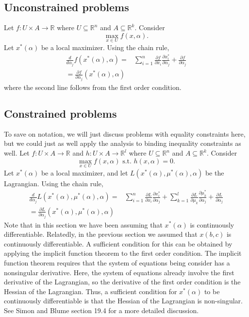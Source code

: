 \documentclass[12pt,reqno]{amsart}
\theoremstyle{definition}
\def\R{\mathbb{R}}
\renewcommand{\to}{{\rightarrow}}
\begin{document}
\subsection{Unconstrained problems}

Let $f:U \times A \to \R$ where $U \subseteq \R^n$ and $A
\subseteq \R^k$. Consider
\[ \max_{x \in U} f(x,\alpha). \]
Let $x^*(\alpha)$ be a local maximizer. Using the chain rule,
\begin{align*}
  \frac{d }{d \alpha_j} f(x^*(\alpha),\alpha) = & \sum_{i=1}^n
  \frac{\partial f}{\partial x_i} \frac{\partial x_i^*}{\partial \alpha_j}
  + \frac{\partial f}{\partial \alpha_j } \\
  = \frac{\partial f}{\partial \alpha_j }(x^*(\alpha),\alpha)
\end{align*}
where the second line follows from the first order condition.


\subsection{Constrained problems}

To save on notation, we will just discuss problems with equality
constraints here, but we could just as well apply the analysis to
binding inequality constraints as well. 
Let $f:U \times A \to \R$ and $h:U \times A \to \R^l$ where $U
\subseteq \R^n$ and $A \subseteq \R^k$. Consider
\[ \max_{x \in U} f(x,\alpha) \text{ s.t. } h(x,\alpha) = 0. \]
Let $x^*(\alpha)$ be a local maximizer, and let
$L(x^*(\alpha),\mu^*(\alpha),\alpha)$ be the Lagrangian. Using the
chain rule, 
\begin{align*}
  \frac{d}{d \alpha_j} L(x^*(\alpha),\mu^*(\alpha),\alpha) = & \sum_{i=1}^n
  \frac{\partial L}{\partial x_i} \frac{\partial x_i^*}{\partial
    \alpha_j} + \sum_{k=1}^l\frac{\partial L}{\partial
    \mu_k} \frac{\partial \mu_k^*}{\partial 
    \alpha_j}   + \frac{\partial L}{\partial \alpha_j } \\
  = \frac{\partial L}{\partial \alpha_j
  }(x^*(\alpha),\mu^*(\alpha),\alpha) 
\end{align*}
Note that in this section we have been assuming that $x^*(\alpha)$ is
continuously differentiable. Relatedly, in the previous section we
assumed that $x(b,c)$ is continuously differentiable. A sufficient
condition for this can be obtained by applying the implicit function
theorem to the first order condition. The implicit function theorem
requires that the system of equations being consider has a nonsingular
derivative. Here, the system of equations already involve the first
derivative of the Lagrangian, so the derivative of the first order
condition is the Hessian of the Lagrangian. Thus, a sufficient
condition for $x^*(\alpha)$ to be continuously differentiable is that
the Hessian of the Lagrangian is non-singular. See Simon and Blume
section 19.4 for a more detailed discussion. 
\end{document}
